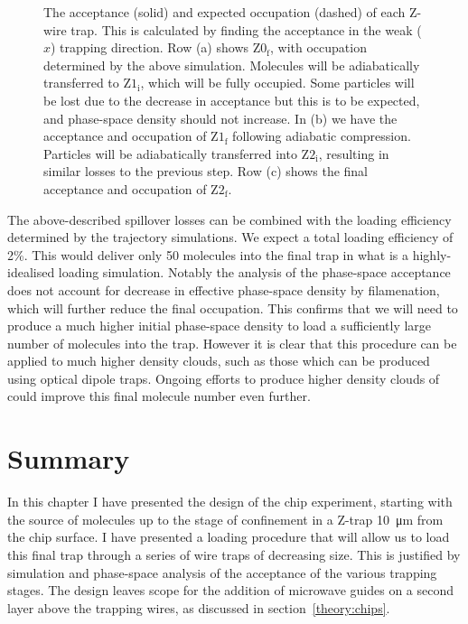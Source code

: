 \begin{figure}[tbhp]
\centering
  \caption[Mode-matching on-chip traps]{
    The acceptance (solid) and expected occupation (dashed) of each Z-wire
    trap. This is calculated by finding the acceptance in the weak ($x$)
    trapping direction. Row (a) shows $\mathrm{Z0_f}$, with occupation
    determined by the above simulation. Molecules will be adiabatically
    transferred to $\mathrm{Z1_i}$, which will be fully occupied. Some
    particles will be lost due to the decrease in acceptance but this is to be
    expected, and phase-space density should not increase. In (b) we have the
    acceptance and occupation of $\mathrm{Z1_f}$ following adiabatic
    compression.  Particles will be adiabatically transferred into
    $\mathrm{Z2_i}$, resulting in similar losses to the previous step. Row (c)
    shows the final acceptance and occupation of $\mathrm{Z2_f}$.
  }
  \label{sim:fig:phasematchinggrid}
\end{figure}


The above-described spillover losses can be combined with the loading
efficiency determined by the trajectory simulations. We expect a total loading
efficiency of 2\%. This would deliver only 50 molecules into the final trap in
what is a highly-idealised loading simulation. Notably the analysis of the
phase-space acceptance does not account for decrease in effective phase-space
density by filamenation, which will further reduce the final occupation. This
confirms that we will need to produce a much higher initial phase-space density
to load a sufficiently large number of molecules into the trap. However it is
clear that this procedure can be applied to much higher density clouds, such as
those which can be produced using optical dipole traps. Ongoing efforts to
produce higher density clouds of \CaF{} could improve this final molecule
number even further.

\section{Summary}

In this chapter I have presented the design of the chip experiment, starting
with the source of molecules up to the stage of confinement in a Z-trap
\SI{10}{\micro\meter} from the chip surface. I have presented
a loading procedure that will allow us to load this final trap through a series
of wire traps of decreasing size. This is justified by simulation and
phase-space analysis of the acceptance of the various trapping stages.
%
The design leaves scope for the addition of microwave guides on a second layer
above the trapping wires, as discussed in section~\ref{theory:chips}.
